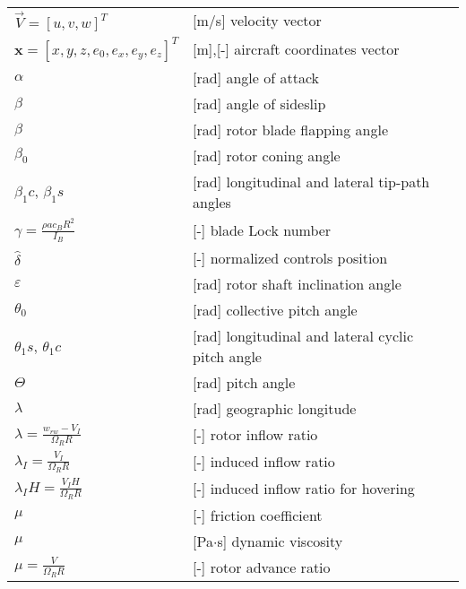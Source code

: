 \begin{longtable}[l]{ l l p{} }
  $\vec V=\left[ u, v, w \right]^T$                      & [m/s] velocity vector \\
  $\boldsymbol x=\left[ x,y,z,e_0,e_x,e_y,e_z \right]^T$ & [m],[-] aircraft coordinates vector \\
  $\alpha$                                               & [rad] angle of attack \\
  $\beta$                                                & [rad] angle of sideslip \\
  $\beta$                                                & [rad] rotor blade flapping angle \\
  $\beta_0$                                              & [rad] rotor coning angle \\
  $\beta_1c$, $\beta_1s$                                 & [rad] longitudinal and lateral tip-path angles \\
  $\gamma=\frac{\rho a c_B R^2}{I_B}$                    & [-] blade Lock number \\
  $\hat \delta$                                          & [-] normalized controls position \\
  $\varepsilon$                                          & [rad] rotor shaft inclination angle \\
  $\theta_0$                                             & [rad] collective pitch angle \\
  $\theta_1s$, $\theta_1c$                               & [rad] longitudinal and lateral cyclic pitch angle \\
  $\Theta$                                               & [rad] pitch angle \\
  $\lambda$                                              & [rad] geographic longitude \\
  $\lambda=\frac{w_{rw} - V_I}{\Omega_R R}$              & [-] rotor inflow ratio \\
  $\lambda_I=\frac{V_I}{\Omega_R R}$                     & [-] induced inflow ratio \\
  $\lambda_IH=\frac{V_IH}{\Omega_R R}$                   & [-] induced inflow ratio for hovering \\
  $\mu$                                                  & [-] friction coefficient \\
  $\mu$                                                  & [Pa$\cdot$s] dynamic viscosity \\
  $\mu=\frac{V}{\Omega_R R}$                             & [-] rotor advance ratio \\

\end{longtable}
